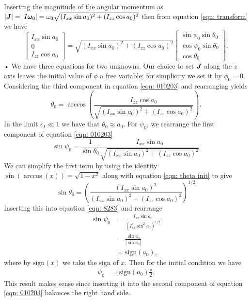 \documentclass[../full_thesis/full_thesis.tex]{subfiles}
\begin{document}
Inserting the magnitude of the angular momentum as
$|\boldsymbol{J}| = |I \boldsymbol{\omega}_{0}|=\omega_{0}\sqrt{(I_{xx}\sin a_{0})^{2} + (I_{zz}\cos a_{0})^{2}}$
then from equation  \eqref{eqn: transform} we have
\begin{equation}
\left[ \begin{array}{c}
I_{xx}\sin a_{0} \\
0 \\
I_{zz} \cos a_{0}
\end{array}\right] =
\sqrt{(I_{xx}\sin a_{0})^{2} + (I_{zz}\cos a_{0})^{2}}
\left[ \begin{array}{c}
\sin \psi_{0} \sin \theta_{0} \\
\cos \psi_{0} \sin \theta_{0} \\
\cos \theta_{0}
\end{array}\right].
\label{eqn: 010203}
\end{equation}•
We have three equations for two unknowns. Our choice to set $\boldsymbol{J}$ along
the $z$ axis leaves the initial value of $\phi$ a free variable; for simplicity
we set it by $\phi_{0} = 0$.
Considering the third component in equation \eqref{eqn: 010203} and rearranging
yields
\begin{equation}
\theta_{0} = \arccos\left(\frac{I_{zz}\cos a_{0}}{ \sqrt{(I_{xx}\sin
        a_{0})^{2} + (I_{zz}\cos a_{0})^{2}}} \right).
\label{eqn: theta init}
\end{equation}
In the limit $\epsilon_{I} \ll 1$ we have that $\theta_{0} \approx a_{0}$.
For $\psi_0$, we rearrange the first component of equation \eqref{eqn: 010203}
\begin{equation}
\sin\psi_{0} =\frac{1}{ \sin\theta_{0}}\frac{ I_{xx}\sin a_{0}}{\sqrt{(I_{xx}\sin a_{0})^{2} + (I_{zz}\cos a_{0})^{2}}}
\label{eqn: 8283}
\end{equation}
We can simplify the first term by using the identity $\sin(\arccos(x)) = \sqrt{1 - x^{2}}$
along with equation \eqref{eqn:  theta init} to give
\begin{equation}
\sin\theta_{0} = \left(\frac{(I_{xx}\sin a_{0})^{2}}
                                      {(I_{xx}\sin a_{0})^{2} + (I_{zz}\cos a_{0})^{2}} \right)^{1/2}
\end{equation}
Inserting this into equation \eqref{eqn: 8283} and rearrange
\begin{align}
\sin \psi_0 & = \frac{I_{xx} \sin a_{0}}{\left(I_{xx}^{2} \sin^{2} a_{0}\right)^{1/2}} \\
 & = \frac{\sin a_{0} }{|\sin a_{0}|} \\
& = \mathrm{sign}(a_{0}),
\end{align}
where by $\mathrm{sign}(x)$ we take the sign of $x$. Then for the initial condition we
have
\begin{align}
\psi_{0} & =\mathrm{sign}(a_{0}) \frac{\pi}{2}.
\label{eqn: psi  init}
\end{align}
This result makes sense since inserting it into the second component of equation \eqref{eqn: 010203}
balances  the right hand side.
\end{document}
